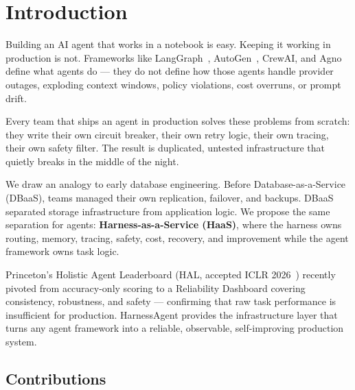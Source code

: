 \documentclass[conference]{IEEEtran}
\begin{document}
\section{Introduction}
\label{sec:introduction}

Building an AI agent that works in a notebook is easy. Keeping it
working in production is not. Frameworks like LangGraph~\cite{langgraph},
AutoGen~\cite{autogen}, CrewAI, and Agno define what agents do — they
do not define how those agents handle provider outages, exploding context
windows, policy violations, cost overruns, or prompt drift.

Every team that ships an agent in production solves these problems from
scratch: they write their own circuit breaker, their own retry logic,
their own tracing, their own safety filter. The result is duplicated,
untested infrastructure that quietly breaks in the middle of the night.

We draw an analogy to early database engineering. Before
Database-as-a-Service (DBaaS), teams managed their own replication,
failover, and backups. DBaaS separated storage infrastructure from
application logic. We propose the same separation for agents:
\textbf{Harness-as-a-Service (HaaS)}, where the harness owns routing,
memory, tracing, safety, cost, recovery, and improvement while the agent
framework owns task logic.

Princeton's Holistic Agent Leaderboard (HAL, accepted ICLR 2026~\cite{hal2025})
recently pivoted from accuracy-only scoring to a Reliability Dashboard
covering consistency, robustness, and safety — confirming that raw task
performance is insufficient for production. HarnessAgent provides the
infrastructure layer that turns any agent framework into a reliable,
observable, self-improving production system.

\subsection*{Contributions}
\end{document}
